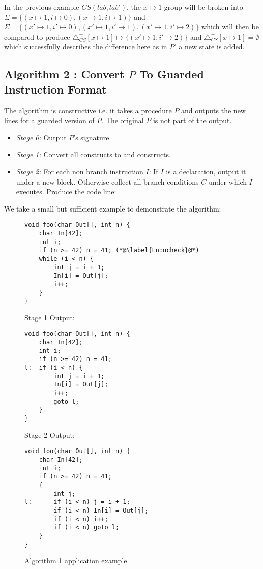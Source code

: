  In the previous example $CS(lab,lab')$, the $x \mapsto 1$ group will be broken into $\Sigma = \{ (x \mapsto 1,i \mapsto 0), (x \mapsto 1,i \mapsto 1) \}$ and $\Sigma = \{(x' \mapsto 1,i' \mapsto 0), (x' \mapsto 1,i' \mapsto 1), (x' \mapsto 1,i' \mapsto 2)\}$ which will then be compared to produce $\triangle_{CS}^{+}[x \mapsto 1]  \mapsto  \{(x' \mapsto 1,i' \mapsto 2)\}$ and $\triangle_{CS}^{-}[x \mapsto 1] = \emptyset$ which successfully describes the difference here as in $P'$ a new state is added.


\subsection{Algorithm 2 : Convert $P$ To Guarded Instruction Format} \label{Se:GuardedAlg}
The algorithm is constructive i.e. it takes a procedure $P$ and outputs the new lines for a guarded version of $P$. The original $P$ is not part of the output.
\begin{itemize}
\item \emph{Stage 0:} Output $P$'s signature.
\item \emph{Stage 1:} Convert all  constructs to  and  constructs.
\item \emph{Stage 2:} For each non branch instruction $I$:
\subitem If $I$ is a declaration, output it under a new block.
\subitem Otherwise collect all branch conditions $C$ under which $I$ executes. Produce the code line: 
\end{itemize}

We take a small but sufficient example to demonstrate the algorithm:
\begin{figure}[H]
\begin{lstlisting}
void foo(char Out[], int n) {
    char In[42];
    int i;
    if (n >= 42) n = 41; (*@\label{Ln:ncheck}@*)
    while (i < n) {
        int j = i + 1;
        In[i] = Out[j];
        i++;
    }
}
\end{lstlisting}
Stage 1 Output:
\begin{lstlisting}
void foo(char Out[], int n) {
    char In[42];
    int i;
    if (n >= 42) n = 41;
l:  if (i < n) {
        int j = i + 1;
        In[i] = Out[j];
        i++;
        goto l;
    }
}
\end{lstlisting}
Stage 2 Output:
\begin{lstlisting}
void foo(char Out[], int n) {
    char In[42];
    int i;
    if (n >= 42) n = 41;
    {
        int j;
l:      if (i < n) j = i + 1;
        if (i < n) In[i] = Out[j];
        if (i < n) i++;
        if (i < n) goto l;
    }
}
\end{lstlisting} \caption{Algorithm 1 application example}
\end{figure}

